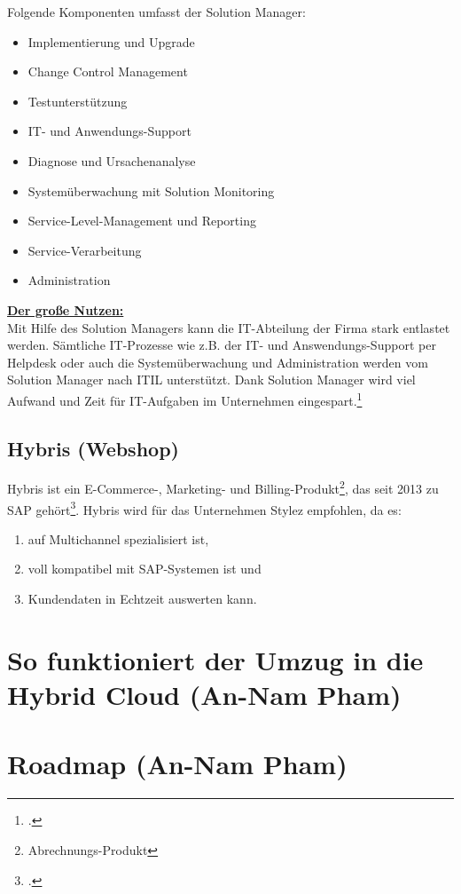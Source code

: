 Folgende Komponenten umfasst der Solution Manager:
\begin{itemize}
\item Implementierung und Upgrade
\item Change Control Management
\item Testunterstützung
\item IT- und Anwendungs-Support
\item Diagnose und Ursachenanalyse
\item Systemüberwachung mit Solution Monitoring
\item Service-Level-Management und Reporting
\item Service-Verarbeitung
\item Administration
\end{itemize}
\underline{\textbf{Der große Nutzen:}}\\
Mit Hilfe des Solution Managers kann die IT-Abteilung der Firma stark entlastet werden. Sämtliche IT-Prozesse wie z.B. der IT- und Answendungs-Support per Helpdesk oder auch die Systemüberwachung und Administration werden vom Solution Manager nach ITIL unterstützt. Dank Solution Manager wird viel Aufwand und Zeit für IT-Aufgaben im Unternehmen eingespart.\footcite[vgl.][]{SolutionManager}

\subsection{Hybris (Webshop)}
Hybris ist ein E-Commerce-, Marketing- und Billing-Produkt\footnote{Abrechnungs-Produkt}, das seit 2013 zu SAP gehört\footcite[vgl.][]{SAPHybris}. Hybris wird für das Unternehmen Stylez empfohlen, da es:
\begin{enumerate}
\item auf Multichannel spezialisiert ist,
\item voll kompatibel mit SAP-Systemen ist und
\item Kundendaten in Echtzeit auswerten kann.
\end{enumerate}
\section{So funktioniert der Umzug in die Hybrid Cloud (An-Nam Pham)}
\section{Roadmap (An-Nam Pham)}
